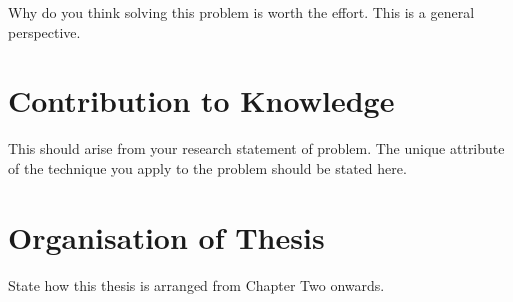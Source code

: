 Why do you think solving this problem is worth the effort. This is a general perspective.

\section{Contribution to Knowledge} 

This should arise from your research statement of problem. The unique attribute of the technique you apply to the problem should be stated here. 

\section{Organisation of Thesis}

State how this thesis is arranged from Chapter Two onwards.  